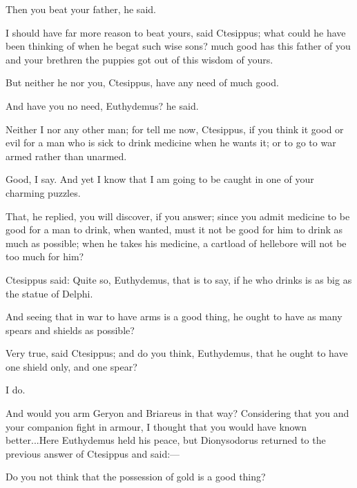 \documentclass[11pt,letter]{article}
\begin{document}
\par  Then you beat your father, he said.

\par  I should have far more reason to beat yours, said Ctesippus; what could he have been thinking of when he begat such wise sons? much good has this father of you and your brethren the puppies got out of this wisdom of yours.

\par  But neither he nor you, Ctesippus, have any need of much good.

\par  And have you no need, Euthydemus? he said.

\par  Neither I nor any other man; for tell me now, Ctesippus, if you think it good or evil for a man who is sick to drink medicine when he wants it; or to go to war armed rather than unarmed.

\par  Good, I say. And yet I know that I am going to be caught in one of your charming puzzles.

\par  That, he replied, you will discover, if you answer; since you admit medicine to be good for a man to drink, when wanted, must it not be good for him to drink as much as possible; when he takes his medicine, a cartload of hellebore will not be too much for him?

\par  Ctesippus said: Quite so, Euthydemus, that is to say, if he who drinks is as big as the statue of Delphi.

\par  And seeing that in war to have arms is a good thing, he ought to have as many spears and shields as possible?

\par  Very true, said Ctesippus; and do you think, Euthydemus, that he ought to have one shield only, and one spear?

\par  I do.

\par  And would you arm Geryon and Briareus in that way? Considering that you and your companion fight in armour, I thought that you would have known better...Here Euthydemus held his peace, but Dionysodorus returned to the previous answer of Ctesippus and said:—

\par  Do you not think that the possession of gold is a good thing?
\end{document}
